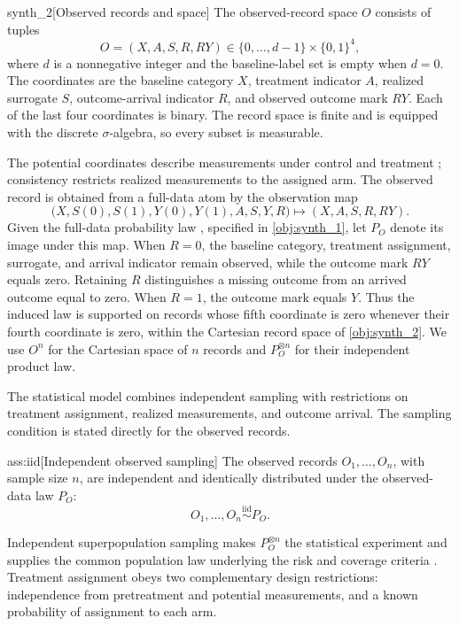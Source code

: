 \begin{definitionv}{synth_2}[Observed records and space]
The observed-record space \(O\) consists of tuples
\[
O=(X,A,S,R,RY)\in \{0,\ldots,d-1\}\times\{0,1\}^{4},
\]
where \(d\) is a nonnegative integer and the baseline-label set is empty when \(d=0\). The coordinates are the baseline category \(X\), treatment indicator \(A\), realized surrogate \(S\), outcome-arrival indicator \(R\), and observed outcome mark \(RY\). Each of the last four coordinates is binary. The record space is finite and is equipped with the discrete \(\sigma\)-algebra, so every subset is measurable.
\end{definitionv}

The potential coordinates describe measurements under control and treatment \citep{Rubin1974}; consistency restricts realized measurements to the assigned arm. The observed record  is obtained from a full-data atom by the observation map
\[
\bigl(X,S(0),S(1),Y(0),Y(1),A,S,Y,R\bigr)
\longmapsto (X,A,S,R,RY).
\]
Given the full-data probability law , specified in \cref{obj:synth_1}, let \(P_O\) denote its image under this map. When \(R=0\), the baseline category, treatment assignment, surrogate, and arrival indicator remain observed, while the outcome mark \(RY\) equals zero. Retaining \(R\) distinguishes a missing outcome from an arrived outcome equal to zero. When \(R=1\), the outcome mark equals \(Y\). Thus the induced law is supported on records whose fifth coordinate is zero whenever their fourth coordinate is zero, within the Cartesian record space of \cref{obj:synth_2}. We use \(O^n\) for the Cartesian space of \(n\) records and \(P_O^{\otimes n}\) for their independent product law.

The statistical model combines independent sampling with restrictions on treatment assignment, realized measurements, and outcome arrival. The sampling condition is stated directly for the observed records.

\begin{assumptionv}{ass:iid}[Independent observed sampling]
The observed records \(O_1,\ldots,O_n\), with sample size \(n\), are independent and identically distributed under the observed-data law \(P_O\):
\[
O_1,\ldots,O_n\stackrel{\mathrm{iid}}{\sim}P_O.
\]
\end{assumptionv}

Independent superpopulation sampling makes \(P_O^{\otimes n}\) the statistical experiment and supplies the common population law underlying the risk and coverage criteria \citep{vanDerVaart1998}. Treatment assignment obeys two complementary design restrictions: independence from pretreatment and potential measurements, and a known probability of assignment to each arm.


